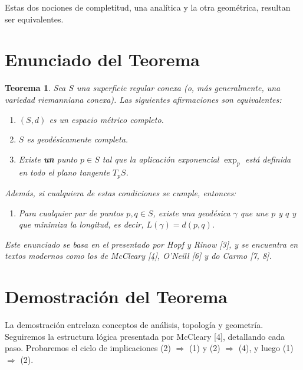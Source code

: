 \documentclass[12pt, a4paper]{report}
\theoremstyle{miestilo}
\newtheorem{teorema}{Teorema}[chapter]
\theoremstyle{midefinicion}
\begin{document}
Estas dos nociones de completitud, una analítica y la otra geométrica, resultan ser equivalentes.

\section{Enunciado del Teorema}

\begin{teorema}
Sea $S$ una superficie regular conexa (o, más generalmente, una variedad riemanniana conexa). Las siguientes afirmaciones son equivalentes:
\begin{enumerate}
    \item[ (1) ] $(S,d)$ es un espacio métrico completo.
    \item[ (2) ] $S$ es geodésicamente completa.
    \item[ (3) ] Existe \textbf{un} punto $p \in S$ tal que la aplicación exponencial $\exp_p$ está definida en todo el plano tangente $T_pS$.
\end{enumerate}
Además, si cualquiera de estas condiciones se cumple, entonces:
\begin{enumerate}
    \item[ (4) ] Para cualquier par de puntos $p, q \in S$, existe una geodésica $\gamma$ que une $p$ y $q$ y que minimiza la longitud, es decir, $L(\gamma) = d(p,q)$.
\end{enumerate}
Este enunciado se basa en el presentado por Hopf y Rinow [3], y se encuentra en textos modernos como los de McCleary [4], O'Neill [6] y do Carmo [7, 8].
\end{teorema}

\section{Demostración del Teorema}

La demostración entrelaza conceptos de análisis, topología y geometría. Seguiremos la estructura lógica presentada por McCleary [4], detallando cada paso. Probaremos el ciclo de implicaciones (2) $\Rightarrow$ (1) y (2) $\Rightarrow$ (4), y luego (1) $\Rightarrow$ (2).
\end{document}
